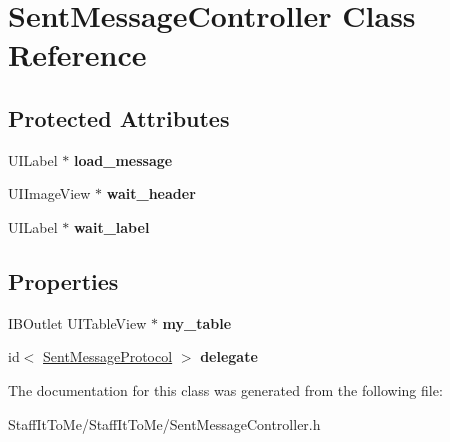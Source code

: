 \hypertarget{interface_sent_message_controller}{
\section{\-Sent\-Message\-Controller \-Class \-Reference}
\label{interface_sent_message_controller}
}
\subsection*{\-Protected \-Attributes}
\begin{DoxyCompactItemize}
\item 
\hypertarget{interface_sent_message_controller_a21c1754c93879aad0cff702f061dc746}{
\-U\-I\-Label $\ast$ {\bfseries load\-\_\-message}}
\label{interface_sent_message_controller_a21c1754c93879aad0cff702f061dc746}

\item 
\hypertarget{interface_sent_message_controller_aa4043ef5f04aeb89203905c1cf907bdc}{
\-U\-I\-Image\-View $\ast$ {\bfseries wait\-\_\-header}}
\label{interface_sent_message_controller_aa4043ef5f04aeb89203905c1cf907bdc}

\item 
\hypertarget{interface_sent_message_controller_acb9c177ed59c31e6baad225cc2483728}{
\-U\-I\-Label $\ast$ {\bfseries wait\-\_\-label}}
\label{interface_sent_message_controller_acb9c177ed59c31e6baad225cc2483728}

\end{DoxyCompactItemize}
\subsection*{\-Properties}
\begin{DoxyCompactItemize}
\item 
\hypertarget{interface_sent_message_controller_adb4e2667206074efe13a07020c7ba853}{
\-I\-B\-Outlet \-U\-I\-Table\-View $\ast$ {\bfseries my\-\_\-table}}
\label{interface_sent_message_controller_adb4e2667206074efe13a07020c7ba853}

\item 
\hypertarget{interface_sent_message_controller_a9c35339d4387e4f85b59016525f6f217}{
id$<$ \hyperlink{protocol_sent_message_protocol-p}{\-Sent\-Message\-Protocol} $>$ {\bfseries delegate}}
\label{interface_sent_message_controller_a9c35339d4387e4f85b59016525f6f217}

\end{DoxyCompactItemize}


\-The documentation for this class was generated from the following file\-:\begin{DoxyCompactItemize}
\item 
\-Staff\-It\-To\-Me/\-Staff\-It\-To\-Me/\-Sent\-Message\-Controller.\-h\end{DoxyCompactItemize}
